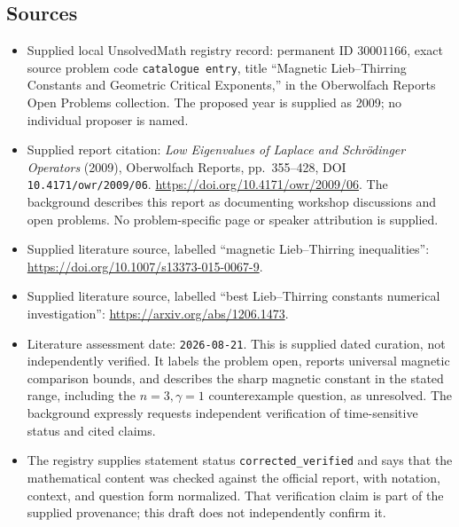 \documentclass[11pt]{article}
\begin{document}
\subsection{Sources}
\begin{itemize}
\item Supplied local UnsolvedMath registry record: permanent ID \(30001166\), exact source problem code \texttt{catalogue entry}, title ``Magnetic Lieb--Thirring Constants and Geometric Critical Exponents,'' in the Oberwolfach Reports Open Problems collection. The proposed year is supplied as 2009; no individual proposer is named.
\item Supplied report citation: \emph{Low Eigenvalues of Laplace and Schr\"odinger Operators} (2009), Oberwolfach Reports, pp.\ 355--428, DOI \texttt{10.4171/owr/2009/06}. \url{https://doi.org/10.4171/owr/2009/06}. The background describes this report as documenting workshop discussions and open problems. No problem-specific page or speaker attribution is supplied.
\item Supplied literature source, labelled ``magnetic Lieb--Thirring inequalities'': \url{https://doi.org/10.1007/s13373-015-0067-9}.
\item Supplied literature source, labelled ``best Lieb--Thirring constants numerical investigation'': \url{https://arxiv.org/abs/1206.1473}.
\item Literature assessment date: \texttt{2026-08-21}. This is supplied dated curation, not independently verified. It labels the problem open, reports universal magnetic comparison bounds, and describes the sharp magnetic constant in the stated range, including the \(n=3,\gamma=1\) counterexample question, as unresolved. The background expressly requests independent verification of time-sensitive status and cited claims.
\item The registry supplies statement status \texttt{corrected\_verified} and says that the mathematical content was checked against the official report, with notation, context, and question form normalized. That verification claim is part of the supplied provenance; this draft does not independently confirm it.
\end{itemize}
\end{document}
